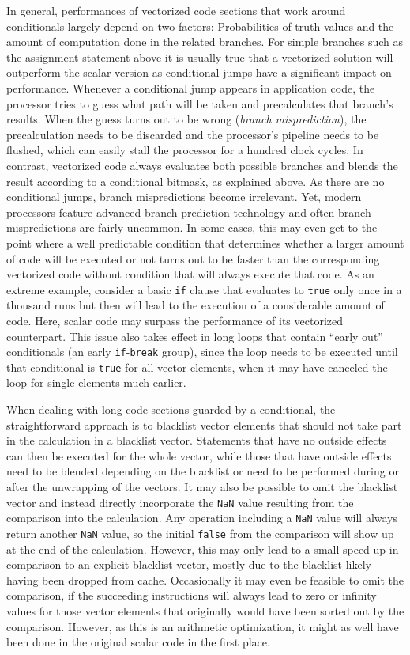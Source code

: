 In general, performances of vectorized code sections that work around conditionals largely depend on two factors: Probabilities of truth values and the amount of computation done in the related branches. For simple branches such as the assignment statement above it is usually true that a vectorized solution will outperform the scalar version as conditional jumps have a significant impact on performance. Whenever a conditional jump appears in application code, the processor tries to guess what path will be taken and precalculates that branch's results. When the guess turns out to be wrong (\emph{branch misprediction}), the precalculation needs to be discarded and the processor's pipeline needs to be flushed, which can easily stall the processor for a hundred clock cycles. In contrast, vectorized code always evaluates both possible branches and blends the result according to a conditional bitmask, as explained above. As there are no conditional jumps, branch mispredictions become irrelevant. Yet, modern processors feature advanced branch prediction technology and often branch mispredictions are fairly uncommon. In some cases, this may even get to the point where a well predictable condition that determines whether a larger amount of code will be executed or not turns out to be faster than the corresponding vectorized code without condition that will always execute that code. As an extreme example, consider a basic \texttt{if} clause that evaluates to \texttt{true} only once in a thousand runs but then will lead to the execution of a considerable amount of code. Here, scalar code may surpass the performance of its vectorized counterpart. This issue also takes effect in long loops that contain ``early out'' conditionals (\eg{}an early \texttt{if}-\texttt{break} group), since the loop needs to be executed until that conditional is \texttt{true} for all vector elements, when it may have canceled the loop for single elements much earlier.

When dealing with long code sections guarded by a conditional, the straightforward approach is to blacklist vector elements that should not take part in the calculation in a blacklist vector. Statements that have no outside effects can then be executed for the whole vector, while those that have outside effects need to be blended depending on the blacklist or need to be performed during or after the unwrapping of the vectors. It may also be possible to omit the blacklist vector and instead directly incorporate the \texttt{NaN} value resulting from the comparison into the calculation. Any operation including a \texttt{NaN} value will always return another \texttt{NaN} value, so the initial \texttt{false} from the comparison will show up at the end of the calculation. However, this may only lead to a small speed-up in comparison to an explicit blacklist vector, mostly due to the blacklist likely having been dropped from cache. Occasionally it may even be feasible to omit the comparison, if the succeeding instructions will always lead to zero or infinity values for those vector elements that originally would have been sorted out by the comparison. However, as this is an arithmetic optimization, it might as well have been done in the original scalar code in the first place.

